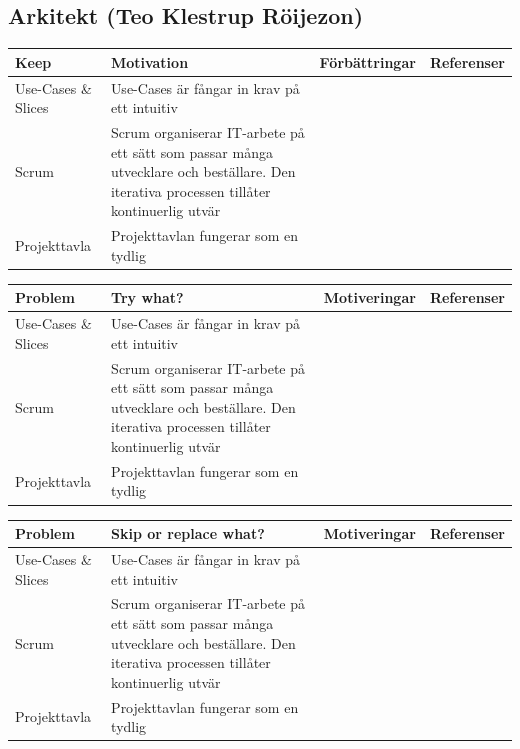 \documentclass[conference,a4paper]{IEEEtran}
\newcommand\Tstrut{\rule{0pt}{2.6ex}}       %
\newcommand\Bstrut{\rule[-0.9ex]{0pt}{0pt}} %
\newcommand{\TBstrut}{\Tstrut\Bstrut} %
\begin{document}
\subsection{Arkitekt (Teo Klestrup Röijezon)}
\begin{table}[H]
	\small
  \centering
	\begin{tabular}{|p{1.5cm}|p{2cm}|p{1.8cm}|p{1.5cm}|} %
    \hline
    Keep & Motivation & Förbättringar & Referenser \TBstrut \\
    \hline
    Use-Cases \& Slices & Use-Cases är fångar in krav på ett intuitiv & & \TBstrut \\
    \hline
    Scrum & Scrum organiserar IT-arbete på ett sätt som passar många utvecklare och beställare. Den iterativa processen tillåter kontinuerlig utvär & & \TBstrut \\
    \hline
    Projekttavla & Projekttavlan fungerar som en tydlig & & \TBstrut \\
    \hline
  \end{tabular}
\end{table}

\begin{table}[H]
	\small
  \centering
	\begin{tabular}{|p{1.5cm}|p{2cm}|p{1.8cm}|p{1.5cm}|} %
    \hline
    Problem & Try what? & Motiveringar & Referenser \TBstrut \\
    \hline
    Use-Cases \& Slices & Use-Cases är fångar in krav på ett intuitiv & & \TBstrut \\
    \hline
    Scrum & Scrum organiserar IT-arbete på ett sätt som passar många utvecklare och beställare. Den iterativa processen tillåter kontinuerlig utvär & & \TBstrut \\
    \hline
    Projekttavla & Projekttavlan fungerar som en tydlig & & \TBstrut \\
    \hline
  \end{tabular}
\end{table}

\begin{table}[H]
	\small
  \centering
	\begin{tabular}{|p{1.5cm}|p{2cm}|p{1.8cm}|p{1.5cm}|} %
    \hline
    Problem & Skip or replace what? & Motiveringar & Referenser \TBstrut \\
    \hline
    Use-Cases \& Slices & Use-Cases är fångar in krav på ett intuitiv & & \TBstrut \\
    \hline
    Scrum & Scrum organiserar IT-arbete på ett sätt som passar många utvecklare och beställare. Den iterativa processen tillåter kontinuerlig utvär & & \TBstrut \\
    \hline
    Projekttavla & Projekttavlan fungerar som en tydlig & & \TBstrut \\
    \hline
  \end{tabular}
\end{table}
\end{document}
